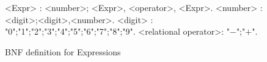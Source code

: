\begin{figure}[H]
\begin{grammar}
<Expr>   \hspace{52pt} : <number>; <Expr>, <operator>, <Expr>.
<number> \hspace{42pt} : <digit>;<digit>,<number>.
<digit> \hspace{55pt} : "0";"1";"2";"3";"4";"5";"6";"7";"8";"9".
<relational operator>: "$-$";"$+$".
\end{grammar}
\caption{BNF definition for Expressions}
\label{grammar:bnf:expr}
\end{figure}